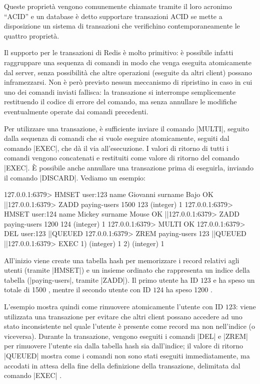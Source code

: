 Queste proprietà vengono comunemente chiamate tramite il loro acronimo ``ACID'' e
un database è detto supportare transazioni ACID se mette a disposizione un sistema di transazioni
che verifichino contemporaneamente le quattro proprietà.

Il supporto per le transazioni di Redis è molto primitivo: è possibile infatti raggruppare
una sequenza di comandi in modo che venga eseguita atomicamente dal server, senza possibilità che
altre operazioni (eseguite da altri client) possano inframezzarsi. Non è però previsto nessun
meccanismo di ripristino in caso in cui uno dei comandi inviati fallisca: la transazione si interrompe
semplicemente restituendo il codice di errore del comando, ma senza annullare le modifiche
eventualmente operate dai comandi precedenti.

Per utilizzare una transazione, è sufficiente inviare il comando \cverb|MULTI|, seguito dalla 
sequenza di comandi che si vuole eseguire atomicamente, seguiti dal comando \cverb|EXEC|, che dà
il via all'esecuzione. I valori di ritorno di tutti i comandi vengono concatenati e restituiti come
valore di ritorno del comando \cverb|EXEC|. È possibile anche annullare una transazione prima di
eseguirla, inviando il comando \cverb|DISCARD|. Vediamo un esempio:

\begin{commentedsource}[style=redis]
127.0.0.1:6379> HMSET user:123 name Giovanni surname Bajo
OK
|\lnote|127.0.0.1:6379> ZADD paying-users 1500 123
(integer) 1
127.0.0.1:6379> HMSET user:124 name Mickey surname Mouse
OK
|\lnote|127.0.0.1:6379> ZADD paying-users 1200 124
(integer) 1
127.0.0.1:6379> MULTI
OK
127.0.0.1:6379> DEL user:123
|\lnote|QUEUED
127.0.0.1:6379> ZREM paying-users 123
|\lnote|QUEUED
|\lnote|127.0.0.1:6379> EXEC
1) (integer) 1
2) (integer) 1
\end{commentedsource}

All'inizio viene create una tabella hash per memorizzare i record relativi agli utenti (tramite
\cverb|HMSET|) e un insieme ordinato che rappresenta un indice della tabella (\cverb|paying-users|,
tramite \cverb|ZADD|). Il primo utente ha ID $123$ e ha speso un totale di \SI{1500}{\EUR}
, mentre il secondo utente con ID $124$ ha speso \SI{1200}{\EUR} .

L'esempio mostra quindi come rimuovere atomicamente l'utente con ID $123$: viene utilizzata una
transazione per evitare che altri client possano accedere ad uno stato inconsistente nel quale
l'utente è presente come record ma non nell'indice (o viceversa). Durante la transazione,
vengono eseguiti i comandi \cverb|DEL| e \cverb|ZREM| per rimuovere l'utente sia dalla tabella
hash sia dall'indice; il valore di ritorno \cverb|QUEUED|   mostra come
i comandi non sono stati eseguiti immediatamente, ma accodati in attesa della fine della 
definizione della transazione, delimitata dal comando \cverb|EXEC| .

